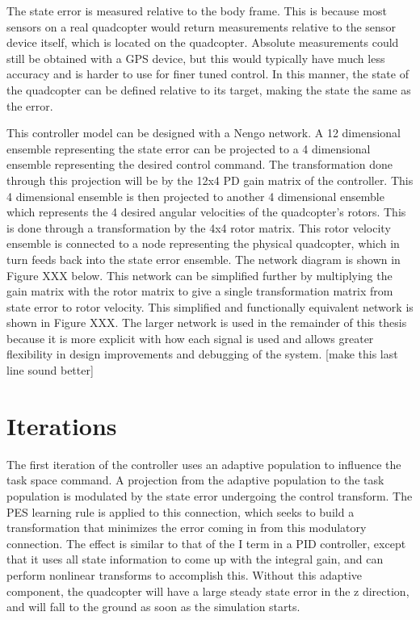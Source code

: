 \documentclass[letterpaper,12pt,titlepage,oneside,final]{book}
\begin{document}

The state error is measured relative to the body frame. This is because most sensors on a real quadcopter would return measurements relative to the sensor device itself, which is located on the quadcopter. Absolute measurements could still be obtained with a GPS device, but this would typically have much less accuracy and is harder to use for finer tuned control. In this manner, the state of the quadcopter can be defined relative to its target, making the state the same as the error.

This controller model can be designed with a Nengo network. 
A 12 dimensional ensemble representing the state error can be projected to a 4 dimensional ensemble representing the desired control command. 
The transformation done through this projection will be by the 12x4 PD gain matrix of the controller. 
This 4 dimensional ensemble is then projected to another 4 dimensional ensemble which represents the 4 desired angular velocities of the quadcopter’s rotors. 
This is done through a transformation by the 4x4 rotor matrix. 
This rotor velocity ensemble is connected to a node representing the physical quadcopter, which in turn feeds back into the state error ensemble. 
The network diagram is shown in Figure XXX below. 
This network can be simplified further by multiplying the gain matrix with the rotor matrix to give a single transformation matrix from state error to rotor velocity. 
This simplified and functionally equivalent network is shown in Figure XXX. The larger network is used in the remainder of this thesis because it is more explicit with how each signal is used and allows greater flexibility in design improvements and debugging of the system. [make this last line sound better]


\section{Iterations}


The first iteration of the controller uses an adaptive population to influence the task space command. 
A projection from the adaptive population to the task population is modulated by the state error undergoing the control transform. 
The PES learning rule is applied to this connection, which seeks to build a transformation that minimizes the error coming in from this modulatory connection. 
The effect is similar to that of the I term in a PID controller, except that it uses all state information to come up with the integral gain, and can perform nonlinear transforms to accomplish this. Without this adaptive component, the quadcopter will have a large steady state error in the z direction, and will fall to the ground as soon as the simulation starts.
\end{document}
